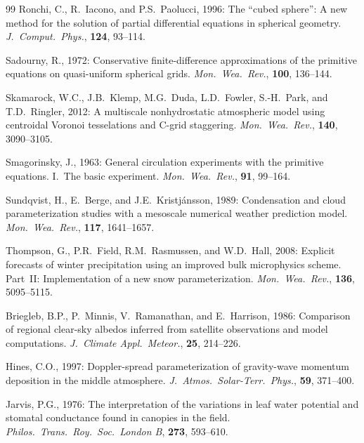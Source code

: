 \documentclass[11pt,a4paper]{article}
\begin{document}
\begin{thebibliography}{99}
Ronchi, C., R.~Iacono, and P.S.~Paolucci, 1996:
The ``cubed sphere'': A new method for the solution of partial differential
equations in spherical geometry.
\textit{J.\ Comput.\ Phys.}, \textbf{124}, 93--114.

Sadourny, R., 1972:
Conservative finite-difference approximations of the primitive equations on
quasi-uniform spherical grids.
\textit{Mon.\ Wea.\ Rev.}, \textbf{100}, 136--144.

Skamarock, W.C., J.B.~Klemp, M.G.~Duda, L.D.~Fowler, S.-H.~Park, and
T.D.~Ringler, 2012:
A multiscale nonhydrostatic atmospheric model using centroidal Voronoi
tesselations and C-grid staggering.
\textit{Mon.\ Wea.\ Rev.}, \textbf{140}, 3090--3105.

Smagorinsky, J., 1963:
General circulation experiments with the primitive equations. I.\ The basic
experiment.
\textit{Mon.\ Wea.\ Rev.}, \textbf{91}, 99--164.

Sundqvist, H., E.~Berge, and J.E.~Kristj\'ansson, 1989:
Condensation and cloud parameterization studies with a mesoscale numerical
weather prediction model.
\textit{Mon.\ Wea.\ Rev.}, \textbf{117}, 1641--1657.

Thompson, G., P.R.~Field, R.M.~Rasmussen, and W.D.~Hall, 2008:
Explicit forecasts of winter precipitation using an improved bulk
microphysics scheme. Part~II: Implementation of a new snow parameterization.
\textit{Mon.\ Wea.\ Rev.}, \textbf{136}, 5095--5115.

Briegleb, B.P., P.~Minnis, V.~Ramanathan, and E.~Harrison, 1986:
Comparison of regional clear-sky albedos inferred from satellite observations
and model computations.
\textit{J.\ Climate Appl.\ Meteor.}, \textbf{25}, 214--226.

Hines, C.O., 1997:
Doppler-spread parameterization of gravity-wave momentum deposition in the
middle atmosphere.
\textit{J.\ Atmos.\ Solar-Terr.\ Phys.}, \textbf{59}, 371--400.

Jarvis, P.G., 1976:
The interpretation of the variations in leaf water potential and stomatal
conductance found in canopies in the field.
\textit{Philos.\ Trans.\ Roy.\ Soc.\ London B}, \textbf{273}, 593--610.


\end{thebibliography}
\end{document}
